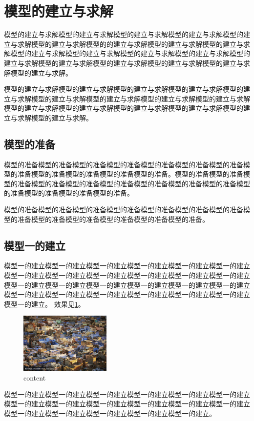 \documentclass{MMCStyle}
\begin{document}
	\section{模型的建立与求解}
模型的建立与求解模型的建立与求解模型的建立与求解模型的建立与求解模型的建立与求解模型的建立与求解模型的的建立与求解模型的建立与求解模型的建立与求解模型的建立与求解模型的建立与求解模型的建立与求解模型的建立与求解模型的建立与求解模型的建立与求解模型的建立与求解模型的建立与求解模型的建立与求解模型的建立与求解。

模型的建立与求解模型的建立与求解模型的建立与求解模型的建立与求解模型的建立与求解模型的建立与求解模型的建立与求解模型的建立与求解模型的建立与求解模型的建立与求解模型的建立与求解模型的建立与求解模型的建立与求解模型的建立与求解模型的建立与求解。
	\subsection{模型的准备}
模型的准备模型的准备模型的准备模型的准备模型的准备模型的准备模型的准备模型的准备模型的准备模型的准备模型的准备模型的准备。模型的准备模型的准备模型的准备模型的准备模型的准备模型的准备模型的准备模型的准备模型的准备模型的准备模型的准备模型的准备模型的准备。

模型的准备模型的准备模型的准备模型的准备模型的准备模型的准备模型的准备模型的准备模型的准备模型的准备模型的准备模型的准备模型的准备。

	\subsection{模型一的建立}
 模型一的建立模型一的建立模型一的建立模型一的建立模型一的建立模型一的建立模型一的建立模型一的建立模型一的建立模型一的建立模型一的建立模型一的建立模型一的建立模型一的建立模型一的建立模型一的建立模型一的建立模型一的建立模型一的建立模型一的建立模型一的建立模型一的建立模型一的建立模型一的建立模型一的建立。
	效果见\cref{fig:1}。
	\begin{figure}[h]
		\centering
		\includegraphics[width=0.4\textwidth]{figure/image.png}
		\caption{content}\label{fig:1}
	\end{figure}
 模型一的建立模型一的建立模型一的建立模型一的建立模型一的建立模型一的建立模型一的建立模型一的建立模型一的建立模型一的建立模型一的建立模型一的建立模型一的建立模型一的建立模型一的建立模型一的建立模型一的建立。
\end{document}
